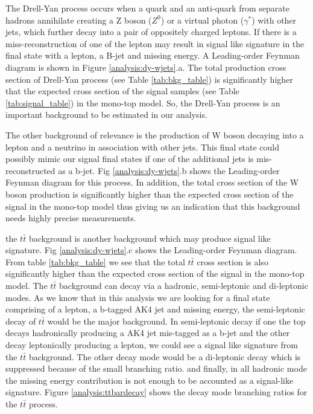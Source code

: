 The Drell-Yan process occurs when a quark and an anti-quark from separate hadrons annihilate creating a Z boson ($Z^{0}$) or a virtual photon ($\gamma^{*}$) with other jets, which further decay into a pair of oppositely charged leptons. If there is a miss-reconstruction of one of the lepton may result in signal like signature in the final state with a lepton, a B-jet and missing energy. A Leading-order Feynman diagram is shown in Figure \ref{analysis:dy-wjets}.a. The total production cross section of Drell-Yan process (see Table \ref{tab:bkg_table}) is significantly higher that the expected cross section of the signal samples (see Table \ref{tab:signal_table}) in the mono-top model. So, the Drell-Yan process is an important background to be estimated in our analysis. 

The other background of relevance is the production of W boson decaying into a lepton and a neutrino in association with other jets. This final state could possibly mimic our signal final states if one of the additional jets is mis-reconstructed as a  b-jet. Fig \ref{analysis:dy-wjets}.b  shows the Leading-order Feynman diagram for this process. In addition, the total cross section of the W boson production is significantly higher than the expected cross section of the signal in the mono-top model thus giving us an  indication that this background needs highly precise measurements.

the $t\bar{t}$ background is another background which may produce signal like signature. Fig \ref{analysis:dy-wjets}.c shows the Leading-order Feynman diagram. From table \ref{tab:bkg_table} we see that the total $t\bar{t}$ cross section is also significantly higher than the expected cross section of the signal in the mono-top model. The $t\bar{t}$ background can decay via a hadronic, semi-leptonic and di-leptonic modes. As we know that in this analysis we are looking for a final state comprising of a lepton, a b-tagged AK4 jet and missing energy, the semi-leptonic decay of $t\bar{t}$ would be the major background. In semi-leptonic decay if one the top decays hadronically producing a AK4 jet mis-tagged as a b-jet and the other decay leptonically producing a lepton, we could see a signal like signature from the $t\bar{t}$ background. The other decay mode would be a di-leptonic decay which is suppressed because of the small branching ratio. and finally, in all hadronic mode the missing energy contribution is not enough to be accounted as a signal-like signature. Figure \ref{analysis:ttbardecay} shows the decay mode branching ratios for the $t\bar{t}$ process.

